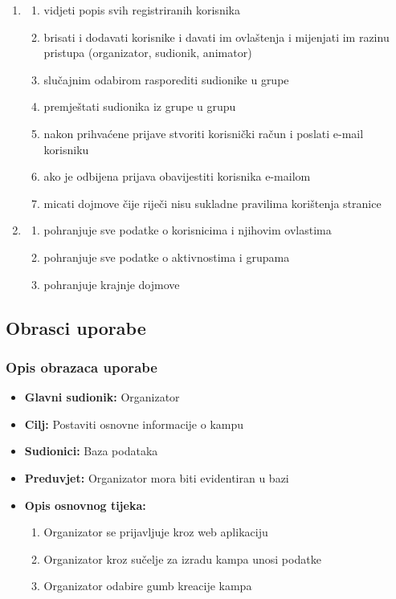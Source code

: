 \begin{enumerate}
	\item {}
	\begin{enumerate}
		\item vidjeti popis svih registriranih korisnika
		\item brisati i dodavati korisnike i davati im ovlaštenja i mijenjati im razinu pristupa (organizator, sudionik, animator)
		\item slučajnim odabirom rasporediti sudionike u grupe
		\item premještati sudionika iz grupe u grupu
		\item nakon prihvaćene prijave stvoriti korisnički račun i poslati e-mail korisniku	
		\item ako je odbijena prijava obavijestiti korisnika e-mailom
		\item micati dojmove čije riječi nisu sukladne pravilima korištenja stranice\\
	\end{enumerate}
	
	\item {}
	
	\begin{enumerate}
		\item pohranjuje sve podatke o korisnicima i njihovim ovlastima
		\item pohranjuje sve podatke o aktivnostima i grupama
		\item pohranjuje krajnje dojmove
	\end{enumerate}
	
	
\end{enumerate}



\newpage
\subsection{Obrasci uporabe}
\subsubsection{Opis obrazaca uporabe}

\noindent {}
\begin{itemize}
	\item \textbf{Glavni sudionik:} Organizator
	\item \textbf{Cilj:} Postaviti osnovne informacije o kampu
	\item \textbf{Sudionici:} Baza podataka
	\item \textbf{Preduvjet:} Organizator mora biti evidentiran u bazi
	\item \textbf{Opis osnovnog tijeka:} 
	\begin{enumerate}	
		\item Organizator se prijavljuje kroz web aplikaciju
		\item Organizator kroz sučelje za izradu kampa unosi podatke
		\item Organizator odabire gumb kreacije kampa\\
	\end{enumerate}
	
\end{itemize}

